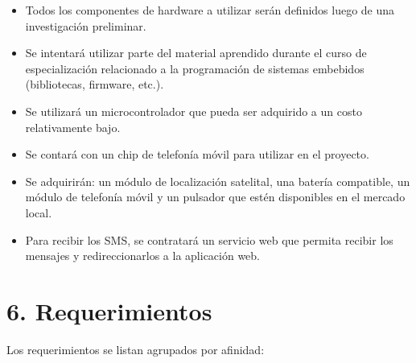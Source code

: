 \documentclass[
11pt, %
]{charter}
\begin{document}
\begin{itemize}
	\item Todos los componentes de hardware a utilizar serán definidos luego de una investigación preliminar.
	\item Se intentará utilizar parte del material aprendido durante el curso de especialización relacionado a la programación de sistemas embebidos (bibliotecas, firmware, etc.).
	\item Se utilizará un microcontrolador que pueda ser adquirido a un costo relativamente bajo.
	\item Se contará con un chip de telefonía móvil para utilizar en el proyecto.
	\item Se adquirirán: un módulo de localización satelital, una batería compatible, un módulo de telefonía móvil y un pulsador que estén disponibles en el mercado local.
	\item Para recibir los SMS, se contratará un servicio web que permita recibir los mensajes y redireccionarlos a la aplicación web.

\end{itemize}

\section{6. Requerimientos}
\label{sec:requerimientos}

Los requerimientos se listan agrupados por afinidad:
\end{document}
